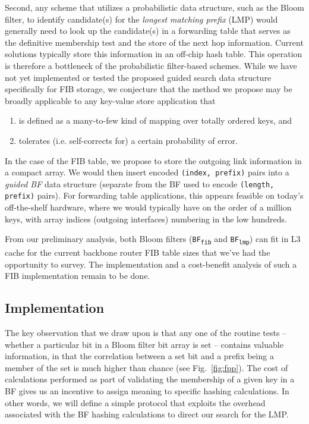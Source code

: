 \documentclass[conference,compsoc]{IEEEtran}
\begin{document}
Second, any scheme that utilizes a probabilistic data structure, such as
the Bloom filter, to identify candidate(s) for the \emph{longest matching
prefix} (LMP) would generally need to look up the candidate(s)
in a forwarding table that serves as the definitive membership
test and the store of the next hop information. Current solutions typically
store this information in an off-chip hash table. This operation is therefore
a bottleneck of the probabilistic filter-based schemes. While we have
not yet implemented or tested the proposed guided search data structure
specifically for FIB storage, we conjecture that the method we propose may be broadly
applicable to any key-value store application that

\begin{enumerate}[label=(\alph*)]
\item is defined as a many-to-few kind of mapping over totally ordered keys, and
\item tolerates (i.e. self-corrects for) a certain probability of error.
\end{enumerate}

In the case of the FIB table, we propose to store the outgoing link information
in a compact array. We would then insert encoded \texttt{(index, prefix)} pairs
into a \emph{guided BF} data structure (separate from the BF used to
encode \texttt{(length, prefix)} pairs). For forwarding table applications, this appears 
feasible on today's off-the-shelf hardware, where we would typically have 
on the order of a
million keys, with array indices (outgoing interfaces) numbering in the low 
hundreds.

From our preliminary analysis, both Bloom filters (\texttt{BF\textsubscript{fib}}
and \texttt{BF\textsubscript{lmp}}) can fit in L3 cache for the
current backbone router FIB table sizes that we've had the opportunity to
survey. The implementation and a cost-benefit analysis of such a FIB 
implementation remain to be done.


\subsection{Implementation}

The key observation that we draw upon is that any one of the routine
tests -- whether a particular bit in a Bloom filter bit array
is set -- contains valuable information, in that the correlation between
a set bit and a prefix being a member of the set is much higher than chance
(see Fig.~\ref{fig:fpp}). The cost of calculations performed as part of
validating the membership of a given key in a BF gives us an incentive to
assign meaning to specific hashing calculations. In other words, we will 
define a simple protocol that exploits the overhead associated with the
BF hashing calculations to direct our search for the LMP.
\end{document}
